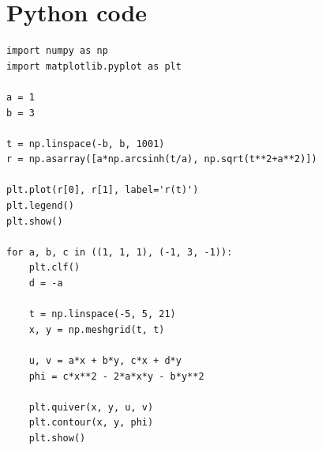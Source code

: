 \documentclass[a4paper,10pt,english]{article}
\begin{document}
\newpage
\section*{Python code}
\begin{lstlisting}
import numpy as np
import matplotlib.pyplot as plt

a = 1
b = 3

t = np.linspace(-b, b, 1001)
r = np.asarray([a*np.arcsinh(t/a), np.sqrt(t**2+a**2)])

plt.plot(r[0], r[1], label='r(t)')
plt.legend()
plt.show()

for a, b, c in ((1, 1, 1), (-1, 3, -1)):
    plt.clf()
    d = -a

    t = np.linspace(-5, 5, 21)
    x, y = np.meshgrid(t, t)

    u, v = a*x + b*y, c*x + d*y
    phi = c*x**2 - 2*a*x*y - b*y**2

    plt.quiver(x, y, u, v)
    plt.contour(x, y, phi)
    plt.show()
\end{lstlisting}
\end{document}
